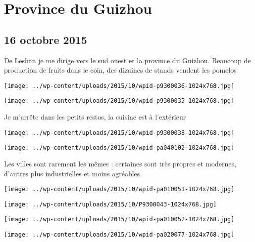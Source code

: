 \chapter{Province du Guizhou}
\section*{16 octobre 2015}
De Leshan je me dirige vers le sud ouest et la province du Guizhou. \newline
 Beaucoup de production de fruits dans le coin, des dizaines de stands vendent les pomelos \newline
 \newline
\centerline{\texttt{[image: ../wp-content/uploads/2015/10/wpid-p9300036-1024x768.jpg]} } 
 \newline
 \newline
\centerline{\texttt{[image: ../wp-content/uploads/2015/10/wpid-p9300035-1024x768.jpg]} } 
 \newline
 Je m'arrête dans les petits restos, la cuisine est à l'extérieur \newline
 \newline
\centerline{\texttt{[image: ../wp-content/uploads/2015/10/wpid-p9300038-1024x768.jpg]} } 
 \newline
 \newline
\centerline{\texttt{[image: ../wp-content/uploads/2015/10/wpid-pa040102-1024x768.jpg]} } 
 \newline
 Les villes sont rarement les mêmes : certaines sont très propres et modernes, d'autres plus industrielles et moins agréables. \newline
 \newline
\centerline{\texttt{[image: ../wp-content/uploads/2015/10/wpid-pa010051-1024x768.jpg]} } 
 \newline
 \newline
\centerline{\texttt{[image: ../wp-content/uploads/2015/10/P9300043-1024x768.jpg]} } 
 \newline
 \newline
\centerline{\texttt{[image: ../wp-content/uploads/2015/10/wpid-pa010052-1024x768.jpg]} } 
 \newline
 \newline
\centerline{\texttt{[image: ../wp-content/uploads/2015/10/wpid-pa020077-1024x768.jpg]} } 
 \newline
 \newline
